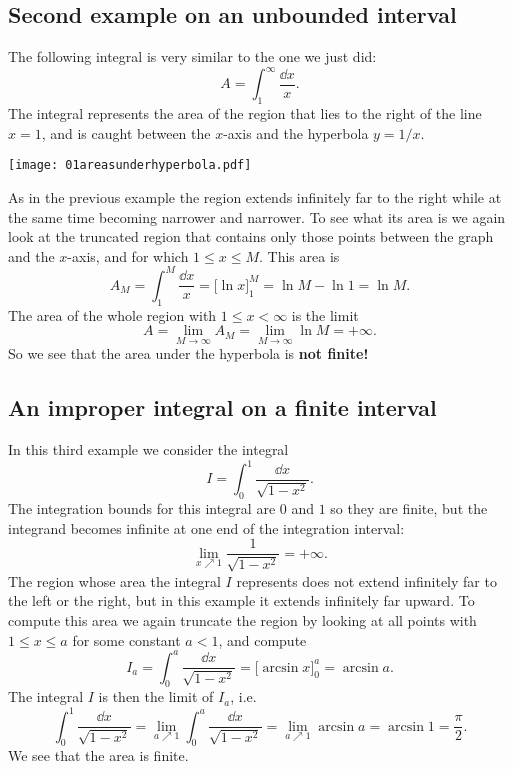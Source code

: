 \subsection{Second example on an unbounded interval}\label{sec:01improper2} %
The following integral is very similar to the one we just did:
\[
A = \int _1^\infty \frac{\dd x} {x}.
\]
The integral represents the area of the region that lies to the right of the
line $x=1$, and is caught between the $x$-axis and the hyperbola $y=1/x$.
\begin{center}
  \texttt{[image: 01areasunderhyperbola.pdf]}
\end{center}
As in the previous example the region extends infinitely far to the right while
at the same time becoming narrower and narrower.  To see what its area is we
again look at the truncated region that contains only those points between the
graph and the $x$-axis, and for which $1\leq x\leq M$.  This area is
\[
A_M = \int_1^M \frac{\dd x} {x} = \bigl[\ln x\bigr]_1^M = \ln M - \ln 1 = \ln M.
\]
The area of the whole region with $1\leq x<\infty$ is the limit
\[
A = \lim_{M\to\infty} A_M = \lim_{M\to\infty} \ln M = +\infty.
\]
So we see that the area under the hyperbola is \textbf{not finite!}

\subsection{An improper integral on a finite interval} %
\label{sec:01improper3}
In this third example we consider the integral
\[
I = \int_0^1 \frac{\dd x} {\sqrt{1-x^2}}.
\]
The integration bounds for this integral are $0$ and $1$ so they are finite, but
the integrand becomes infinite at one end of the integration interval:
\marginpar{}
\[
\lim_{x\nearrow 1} \frac{1} {\sqrt{1-x^2}} = +\infty.
\]
The region whose area the integral $I$ represents does not extend infinitely far
to the left or the right, but in this example it extends infinitely far upward.
To compute this area we again truncate the region by looking at all points with
$1\leq x\leq a$ for some constant $a<1$, and compute
\[
I_a = \int_0^a \frac{\dd x} {\sqrt{1-x^2}} = \bigl[\arcsin x\bigr]_0^a = \arcsin
a.
\]
The integral $I$ is then the limit of $I_a$, i.e.
\[
\int_0^1\frac{\dd x} {\sqrt{1-x^2}} = \lim_{a\nearrow 1} \int_0^a\frac{\dd x}
{\sqrt{1-x^2}} = \lim_{a\nearrow1} \arcsin a = \arcsin 1 = \frac{\pi} {2}.
\]
We see that the area is finite.


